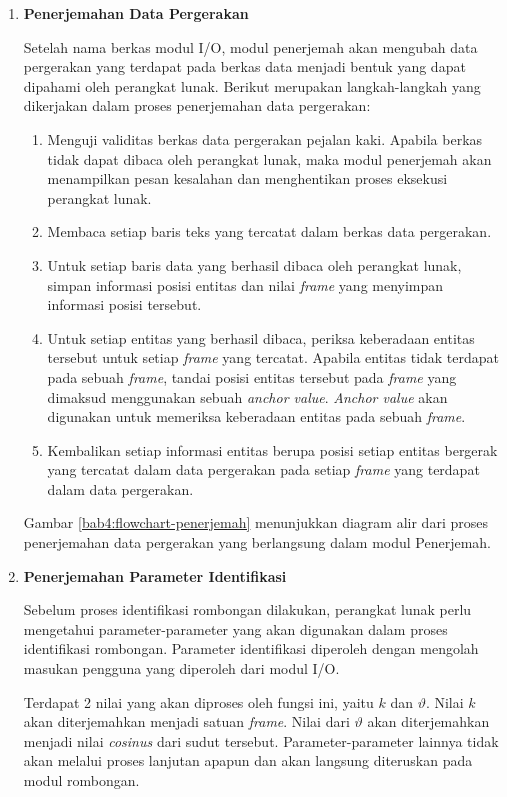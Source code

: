 \begin{enumerate}
    \item \textbf{Penerjemahan Data Pergerakan}
    
    Setelah nama berkas  modul I/O, modul penerjemah akan mengubah data pergerakan yang terdapat pada berkas data menjadi bentuk yang dapat dipahami oleh perangkat lunak. Berikut merupakan langkah-langkah yang dikerjakan dalam proses penerjemahan data pergerakan:
    
    \begin{enumerate}
        \item Menguji validitas berkas data pergerakan pejalan kaki. Apabila berkas tidak dapat dibaca oleh perangkat lunak, maka modul penerjemah akan menampilkan pesan kesalahan dan menghentikan proses eksekusi perangkat lunak.
        
        \item Membaca setiap baris teks yang tercatat dalam berkas data pergerakan.
    
        \item Untuk setiap baris data yang berhasil dibaca oleh perangkat lunak, simpan informasi posisi entitas dan nilai \textit{frame} yang menyimpan informasi posisi tersebut.
        
        \item Untuk setiap entitas yang berhasil dibaca, periksa keberadaan entitas tersebut untuk setiap \textit{frame} yang tercatat. Apabila entitas tidak terdapat pada sebuah \textit{frame}, tandai posisi entitas tersebut pada \textit{frame} yang dimaksud menggunakan sebuah \textit{anchor value}. \textit{Anchor value} akan digunakan untuk memeriksa keberadaan entitas pada sebuah \textit{frame}.
        
        \item Kembalikan setiap informasi entitas berupa posisi setiap entitas bergerak yang tercatat dalam data pergerakan pada setiap \textit{frame} yang terdapat dalam data pergerakan.
    \end{enumerate}
    
    Gambar \ref{bab4:flowchart-penerjemah} menunjukkan diagram alir dari proses penerjemahan data pergerakan yang berlangsung dalam modul Penerjemah.

    \item \textbf{Penerjemahan Parameter Identifikasi}
    
    Sebelum proses identifikasi rombongan dilakukan, perangkat lunak perlu mengetahui parameter-parameter yang akan digunakan dalam proses identifikasi rombongan. Parameter identifikasi diperoleh dengan mengolah masukan pengguna yang diperoleh dari modul I/O.
    
    Terdapat 2 nilai yang akan diproses oleh fungsi ini, yaitu $k$ dan $\vartheta$. Nilai $k$ akan diterjemahkan menjadi satuan \textit{frame}. Nilai dari $\vartheta$ akan diterjemahkan menjadi nilai \textit{cosinus} dari sudut tersebut. Parameter-parameter lainnya tidak akan melalui proses lanjutan apapun dan akan langsung diteruskan pada modul rombongan.
\end{enumerate}

